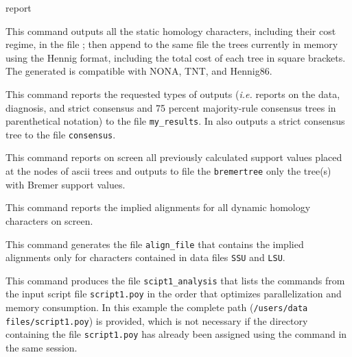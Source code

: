 \begin{command}{report}{}
\begin{poyexamples}
            {This command outputs all the static homology characters, including their cost
            regime, in the file ; then append to the same
            file the trees currently in memory using the Hennig format, 
            including the total cost of each tree in square brackets. The
            generated  is compatible with NONA, TNT, and
            Hennig86.
             }
            
         {This command reports the requested types of outputs (\emph{i.e.}
        reports on the data, diagnosis, and strict consensus and 75 percent
         majority-rule consensus trees in parenthetical notation) to the file
         \texttt{my\_results}. In also outputs a strict consensus tree to the file
         \texttt{consensus}.}
         
         {This command reports on screen all previously calculated support values
         placed at the nodes of ascii trees and outputs to file the \texttt{bremertree}
         only the tree(s) with Bremer support values.}
         
         {This command reports the implied alignments for all dynamic homology
         characters on screen.}
         
          {This command generates the file \texttt{align\_file} that contains
          the implied alignments only for characters contained in data files
          \texttt{SSU} and \texttt{LSU}.}
          
          {This command produces the file \texttt{scipt1\_analysis} that lists the commands from
          the input script file \texttt{script1.poy} in the order that optimizes parallelization and
          memory consumption. In this example the complete path (\texttt{/users/data files/script1.poy})
          is provided, which is not necessary if the directory containing the file \texttt{script1.poy}
          has already been assigned using the command  in the same \poy session.}
          

\end{poyexamples}
\end{command}
